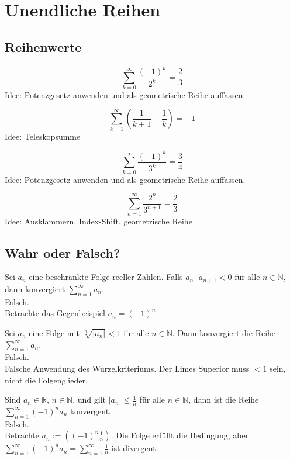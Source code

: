 \documentclass[parskip=full]{scrartcl}
\begin{document}
\section{Unendliche Reihen}
\subsection{Reihenwerte}
\begin{displaymath}
  \sum_{k = 0}^{\infty} \frac{(-1)^k}{2^k} = \frac{2}{3}
\end{displaymath}
Idee: Potenzgesetz anwenden und als geometrische Reihe auffassen.

\begin{displaymath}
  \sum_{k = 1}^{\infty} \left(\frac{1}{k+1}-\frac{1}{k}\right) = -1
\end{displaymath}
Idee: Teleskopsumme

\begin{displaymath}
  \sum_{k = 0}^{\infty} \frac{(-1)^k}{3^k} = \frac{3}{4}
\end{displaymath}
Idee: Potenzgesetz anwenden und als geometrische Reihe auffassen.

\begin{displaymath}
  \sum_{n = 1}^{\infty} \frac{2^n}{3^{n+1}} = \frac{2}{3}
\end{displaymath}
Idee: Ausklammern, Index-Shift, geometrische Reihe

\subsection{Wahr oder Falsch?}
Sei $a_n$ eine beschränkte Folge reeller Zahlen.
Falls $a_n \cdot a_{n+1} < 0$ für alle $n \in \mathbb{N}$, dann konvergiert $\sum\limits_{n = 1}^{\infty} a_n$.\\
Falsch.\\
Betrachte das Gegenbeispiel $a_n = (-1)^n$.

Sei $a_n$ eine Folge mit $\sqrt[n]{|a_n|} < 1$ für alle $n \in \mathbb{N}$. Dann konvergiert die Reihe $\sum\limits_{n = 1}^{\infty} a_n$.\\
Falsch.\\
Falsche Anwendung des Wurzelkriteriums. Der Limes Superior muss $< 1$ sein, nicht die Folgenglieder.

Sind $a_n \in \mathbb{R}$, $n \in \mathbb{N}$, und gilt $|a_n| \leq \frac{1}{n}$ für alle $n \in \mathbb{N}$, dann ist die Reihe $\sum_{n = 1}^{\infty} (-1)^n a_n$ konvergent.\\
Falsch.\\
Betrachte $a_n := \left((-1)^n \frac{1}{n}\right)$. Die Folge erfüllt die Bedingung, aber $\sum_{n = 1}^{\infty} (-1)^n a_n = \sum_{n = 1}^{\infty} \frac{1}{n}$ ist divergent.
\end{document}
